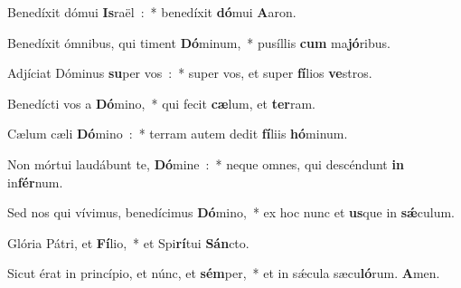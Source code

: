 \item Benedíxit dómui \textbf{Is}raël~:~* benedíxit \textbf{dó}mui \textbf{A}aron.
\item Benedíxit ómnibus, qui timent \textbf{Dó}minum,~* pu\-síl\-lis \textbf{cum} ma\textbf{jó}ribus.
\item Adjíciat Dóminus \textbf{su}per vos~:~* super vos, et super \textbf{fí}\-li\-os \textbf{ve}stros.
\item Benedícti vos a \textbf{Dó}mino,~* qui fecit \textbf{cæ}lum, et \textbf{ter}ram.
\item Cælum cæli \textbf{Dó}mino~:~* terram autem dedit \textbf{fí}liis \textbf{hó}\-mi\-num.
\item Non mórtui laudábunt te, \textbf{Dó}mine~:~* neque omnes, qui descéndunt \textbf{in} in\textbf{fér}num.
\item Sed nos qui vívimus, benedícimus \textbf{Dó}mino,~* ex hoc nunc et \textbf{us}que in \textbf{sǽ}culum.
\item Glória Pátri, et \textbf{Fí}lio,~* et Spi\textbf{rí}tui \textbf{Sán}cto.
\item Sicut érat in princípio, et núnc, et \textbf{sém}per,~* et in sǽcula sæcu\textbf{ló}rum. \textbf{A}men.